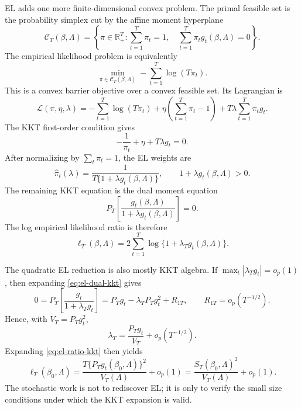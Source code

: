 \documentclass[12pt]{article}
\numberwithin{equation}{section}
\theoremstyle{definition}
\newcommand{\R}{\mathbb R}
\begin{document}
EL adds one more finite-dimensional convex problem. The primal feasible set is
the probability simplex cut by the affine moment hyperplane
\[
    \mathcal C_T(\beta,\Lambda)
    =\left\{\pi\in\R^T_+:
       \sum_{t=1}^T\pi_t=1,
       \quad \sum_{t=1}^T\pi_tg_t(\beta,\Lambda)=0
     \right\}.
\]
The empirical likelihood problem is equivalently
\begin{equation}
    \min_{\pi\in\mathcal C_T(\beta,\Lambda)}
    -\sum_{t=1}^T\log(T\pi_t).
    \label{eq:el-primal-convex}
\end{equation}
This is a convex barrier objective over a convex feasible set. Its Lagrangian is
\[
    \mathcal L(\pi,\eta,\lambda)
    =-\sum_{t=1}^T\log(T\pi_t)
      +\eta\left(\sum_{t=1}^T\pi_t-1\right)
      +T\lambda\sum_{t=1}^T\pi_tg_t.
\]
The KKT first-order condition gives
\[
    -\frac{1}{\pi_t}+\eta+T\lambda g_t=0.
\]
After normalizing by \(\sum_t\pi_t=1\), the EL weights are
\begin{equation}
    \widehat\pi_t(\lambda)
    =\frac{1}{T\{1+\lambda g_t(\beta,\Lambda)\}},
    \qquad
    1+\lambda g_t(\beta,\Lambda)>0.
    \label{eq:el-kkt-weights}
\end{equation}
The remaining KKT equation is the dual moment equation
\begin{equation}
    P_T\left[\frac{g_t(\beta,\Lambda)}
    {1+\lambda g_t(\beta,\Lambda)}\right]=0.
    \label{eq:el-dual-kkt}
\end{equation}
The log empirical likelihood ratio is therefore
\begin{equation}
    \ell_T(\beta,\Lambda)
    =2\sum_{t=1}^T\log\{1+\lambda_Tg_t(\beta,\Lambda)\}.
    \label{eq:el-ratio-kkt}
\end{equation}

The quadratic EL reduction is also mostly KKT algebra. If
\(\max_t|\lambda_Tg_t|=o_p(1)\), then expanding
\eqref{eq:el-dual-kkt} gives
\[
    0=P_T\left[\frac{g_t}{1+\lambda_Tg_t}\right]
      =P_Tg_t-\lambda_TP_Tg_t^2+R_{1T},
    \qquad
    R_{1T}=o_p(T^{-1/2}).
\]
Hence, with \(V_T=P_Tg_t^2\),
\[
    \lambda_T=\frac{P_Tg_t}{V_T}+o_p(T^{-1/2}).
\]
Expanding \eqref{eq:el-ratio-kkt} then yields
\begin{equation}
    \ell_T(\beta_0,\Lambda)
    =\frac{T\{P_Tg_t(\beta_0,\Lambda)\}^2}{V_T(\Lambda)}+o_p(1)
    =\frac{S_T(\beta_0,\Lambda)^2}{V_T(\Lambda)}+o_p(1).
    \label{eq:el-kkt-quadratic}
\end{equation}
The stochastic work is not to rediscover EL; it is only to verify the small size
conditions under which the KKT expansion is valid.
\end{document}
